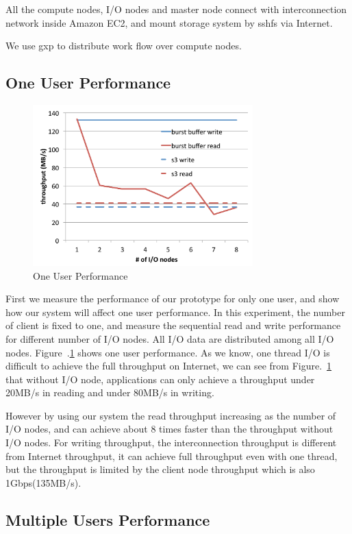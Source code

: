 All the compute nodes, I/O nodes and master node connect with interconnection network inside Amazon
EC2, and mount storage system by sshfs\cite{sshfs} via Internet.

We use gxp\cite{gxp} to distribute work flow over compute nodes.

\subsection{One User Performance}

\begin{figure}
\centering
\includegraphics[width=8.5cm]{img/one_client.pdf}
\caption{One User Performance}
\label{evaluation:one user performance}
\end{figure}

First we measure the performance of our prototype for only one user, and show how our system
will affect one user performance.
In this experiment, the number of client is fixed to one, and measure
the sequential read and write performance for different number of I/O nodes.
All I/O data are distributed among all I/O nodes.
Figure~.\ref{evaluation:one user performance} shows one user performance.
As we know, one thread I/O is difficult to achieve the full throughput on Internet, we can see from
Figure.~\ref{evaluation:one user performance} that without I/O node, applications can only achieve a
throughput under 20MB/s in reading and under 80MB/s in writing.

However by using our system the read throughput increasing as the number of I/O nodes, and can
achieve about 8 times faster than the throughput without I/O nodes.
For writing throughput, the interconnection throughput is different from Internet throughput, it can
achieve full throughput even with one thread, but the throughput is limited by the client node
throughput which is also 1Gbps(135MB/s).

\subsection{Multiple Users Performance}

